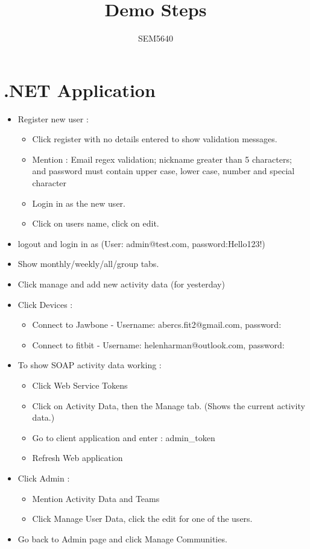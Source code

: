 \documentclass[10pt,a4paper]{report}
\author{SEM5640 }
\title{Demo Steps}
\begin{document}
\section*{.NET Application}
\begin{itemize}
\item Register new user :
	\begin{itemize}
	\item Click register with no details entered to show validation messages.
	\item Mention : Email regex validation; nickname greater than 5 characters; and password must contain upper case, lower case, number and special character
	\item Login in as the new user. 
	\item Click on users name, click on edit.
	\end{itemize}
\item logout and login in as (User: admin@test.com, password:Hello123!)
\item Show monthly/weekly/all/group tabs.
\item Click manage and add new activity data (for yesterday) 
\item Click Devices :
	\begin{itemize}
	\item Connect to Jawbone - Username: abercs.fit2@gmail.com, password:                  
	\item Connect to fitbit - Username: helenharman@outlook.com, password:                 
	\end{itemize}
\item To show SOAP activity data working :
	\begin{itemize}
	\item Click Web Service Tokens
	\item Click on Activity Data, then the Manage tab. (Shows the current activity data.)
	\item Go to client application and enter : admin\_token
	\item Refresh Web application 
	\end{itemize}
\item Click Admin :
	\begin{itemize}
	\item Mention Activity Data and Teams
	\item Click Manage User Data, click the edit for one of the users.
	\end{itemize}
\item Go back to Admin page and click Manage Communities.
\end{itemize}
\pagebreak
\end{document}

